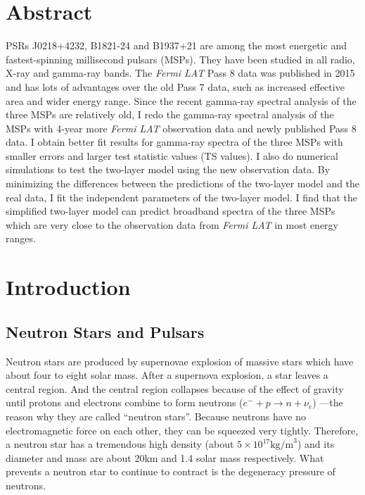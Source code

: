 \documentclass[12pt]{report}
\begin{document}
\chapter*{Abstract}
  \doublespacing
  PSRs J0218+4232, B1821-24 and B1937+21 are among the most energetic and fastest-spinning 
  millisecond pulsars (MSPs). They have been studied in all radio, X-ray and gamma-ray bands. 
  The \textit{Fermi LAT} Pass 8 data was published in 2015 and has lots of advantages over 
  the old Pass 7 data, such as increased effective area and wider energy range. Since 
  the recent gamma-ray spectral analysis of the three MSPs are relatively old, 
  I redo the gamma-ray spectral analysis of the MSPs with 
  4-year more \textit{Fermi LAT} observation data and newly published Pass 8 data. 
  I obtain better fit results for gamma-ray spectra of the three MSPs with smaller errors 
  and larger test statistic values (TS values). I also do numerical simulations to test the 
  two-layer model \citep{0004-637X-787-2-167} using the new 
  observation data. By minimizing the differences between the predictions of the two-layer 
  model and the real data, I fit the independent parameters of the two-layer model. I find that
  the simplified two-layer model can predict broadband spectra of the three 
  MSPs which are very close to the observation data from \textit{Fermi LAT} in most energy
  ranges.
			
\cleardoublepage
{}
\newpage

\cleardoublepage
{}
\newpage
\tableofcontents


\listoffigures
 
\cleardoublepage
\newpage
\listoftables


\chapter{Introduction}   	   
  \section{Neutron Stars and Pulsars}
    Neutron stars are produced by supernovae explosion of massive stars which have about four 
    to eight solar mass. After a supernova explosion, a star leaves a central region. 
    And the central region collapses because of the effect of 
    gravity until protons and electrons combine to form neutrons 
    ($e^{-}+p\rightarrow n+\nu_{e}$) ---the reason why they are called ``neutron stars''.  
    Because neutrons have no electromagnetic force on each other, they can be squeezed very 
    tightly. Therefore, a neutron star has a tremendous high density 
    (about $5\times 10^{17} \mbox{kg/m}^3$) and its diameter and mass are about 20km and 
    1.4 solar mass respectively. What
    prevents a neutron star to continue to contract is the degeneracy pressure of neutrons. 
    
\end{document}
